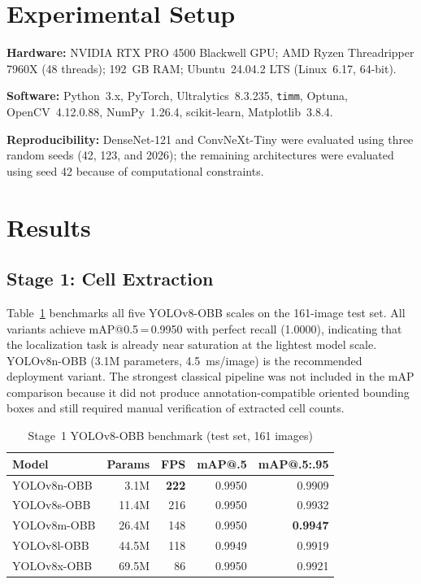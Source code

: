 \documentclass[conference]{IEEEtran}
\begin{document}
\section{Experimental Setup}
\label{sec:setup}

\textbf{Hardware:} NVIDIA RTX PRO 4500 Blackwell GPU; AMD Ryzen Threadripper 7960X (48 threads); 192~GB RAM; Ubuntu~24.04.2 LTS (Linux~6.17, 64-bit).

\textbf{Software:} Python~3.x, PyTorch, Ultralytics~8.3.235, \texttt{timm}, Optuna, OpenCV~4.12.0.88, NumPy~1.26.4, scikit-learn, Matplotlib~3.8.4.

\textbf{Reproducibility:} DenseNet-121 and ConvNeXt-Tiny were evaluated using three random seeds (42, 123, and 2026); the remaining architectures were evaluated using seed 42 because of computational constraints.

\section{Results}
\label{sec:results}

\subsection{Stage 1: Cell Extraction}

Table~\ref{tab:stage1_results} benchmarks all five YOLOv8-OBB scales on the 161-image test set. All variants achieve mAP@0.5\,=\,0.9950 with perfect recall (1.0000), indicating that the localization task is already near saturation at the lightest model scale. YOLOv8n-OBB (3.1M parameters, 4.5~ms/image) is the recommended deployment variant. The strongest classical pipeline was not included in the mAP comparison because it did not produce annotation-compatible oriented bounding boxes and still required manual verification of extracted cell counts.

\begin{table}[t]
  \caption{Stage~1 YOLOv8-OBB benchmark (test set, 161 images)}
  \label{tab:stage1_results}
  \begin{center}
  \renewcommand{\arraystretch}{0.95}\small
  \begin{tabular}{lrrrr}
    \toprule
    \textbf{Model} & \textbf{Params} & \textbf{FPS} & \textbf{mAP@.5} & \textbf{mAP@.5:.95}\\
    \midrule
    YOLOv8n-OBB & 3.1M  & \textbf{222} & 0.9950 & 0.9909\\
    YOLOv8s-OBB & 11.4M & 216          & 0.9950 & 0.9932\\
    YOLOv8m-OBB & 26.4M & 148          & 0.9950 & \textbf{0.9947}\\
    YOLOv8l-OBB & 44.5M & 118          & 0.9949 & 0.9919\\
    YOLOv8x-OBB & 69.5M & 86           & 0.9950 & 0.9921\\
    \midrule
  \end{tabular}
  \end{center}
\end{table}
\end{document}
